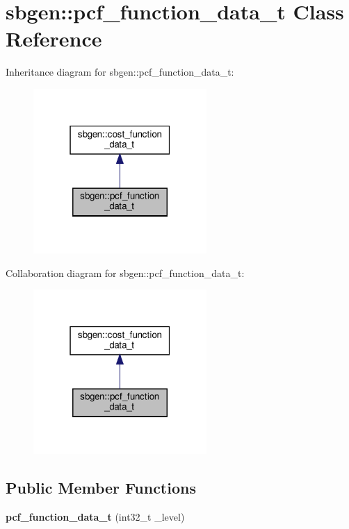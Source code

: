 \hypertarget{classsbgen_1_1pcf__function__data__t}{}\section{sbgen\+:\+:pcf\+\_\+function\+\_\+data\+\_\+t Class Reference}
\label{classsbgen_1_1pcf__function__data__t}


Inheritance diagram for sbgen\+:\+:pcf\+\_\+function\+\_\+data\+\_\+t\+:
\nopagebreak
\begin{figure}[H]
\begin{center}
\leavevmode
\includegraphics[width=187pt]{classsbgen_1_1pcf__function__data__t__inherit__graph}
\end{center}
\end{figure}


Collaboration diagram for sbgen\+:\+:pcf\+\_\+function\+\_\+data\+\_\+t\+:
\nopagebreak
\begin{figure}[H]
\begin{center}
\leavevmode
\includegraphics[width=187pt]{classsbgen_1_1pcf__function__data__t__coll__graph}
\end{center}
\end{figure}
\subsection*{Public Member Functions}
\begin{DoxyCompactItemize}
\item 
\mbox{\label{classsbgen_1_1pcf__function__data__t_ae1d3679b0264cfe15e7c704bf218edb8}} 
{\bfseries pcf\+\_\+function\+\_\+data\+\_\+t} (int32\+\_\+t \+\_\+level)
\end{DoxyCompactItemize}
